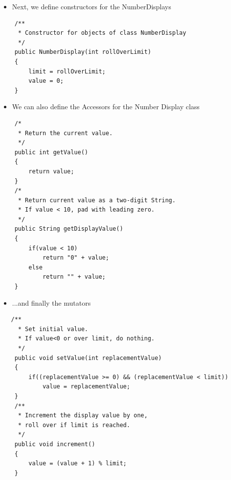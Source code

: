 \documentclass{beamer}
\begin{document}
\begin{frame}[fragile]

\begin{itemize}
\item Next, we define constructors for the NumberDisplays
\end{itemize}

\begin{block}{}
\begin{lstlisting}
    /**
     * Constructor for objects of class NumberDisplay
     */
    public NumberDisplay(int rollOverLimit)
    {
        limit = rollOverLimit;
        value = 0;
    }
\end{lstlisting}
\end{block}

\end{frame}

\begin{frame}[fragile]

\begin{itemize}
\item We can also define the Accessors for the Number Display class
\end{itemize}

\scriptsize
\begin{block}{}
\begin{lstlisting}
    /*
     * Return the current value.
     */
    public int getValue()
    {
        return value;
    }
    /*
     * Return current value as a two-digit String. 
     * If value < 10, pad with leading zero.
     */
    public String getDisplayValue()
    {
        if(value < 10)
            return "0" + value;
        else
            return "" + value;
    }
\end{lstlisting}
\end{block}

\end{frame}

\begin{frame}[fragile]

\begin{itemize}
\item ...and finally the mutators
\end{itemize}

\begin{block}{}
\begin{lstlisting}
   /**
     * Set initial value. 
     * If value<0 or over limit, do nothing.
     */
    public void setValue(int replacementValue)
    {
        if((replacementValue >= 0) && (replacementValue < limit))
            value = replacementValue;
    }
    /**
     * Increment the display value by one, 
     * roll over if limit is reached.
     */
    public void increment()
    {
        value = (value + 1) % limit;
    }

\end{lstlisting}
\end{block}

\end{frame}
\end{document}

